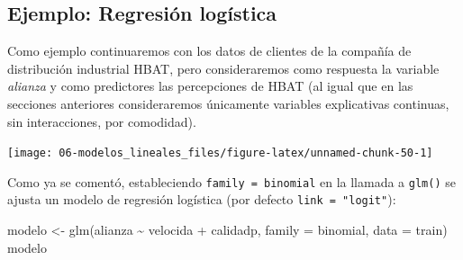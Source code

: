 \documentclass[
]{book}
\newenvironment{Shaded}{\begin{snugshade}}{\end{snugshade}}
\newcommand{\AttributeTok}[1]{\textcolor[rgb]{0.77,0.63,0.00}{#1}}
\newcommand{\CommentTok}[1]{\textcolor[rgb]{0.56,0.35,0.01}{\textit{#1}}}
\newcommand{\DecValTok}[1]{\textcolor[rgb]{0.00,0.00,0.81}{#1}}
\newcommand{\FloatTok}[1]{\textcolor[rgb]{0.00,0.00,0.81}{#1}}
\newcommand{\FunctionTok}[1]{\textcolor[rgb]{0.00,0.00,0.00}{#1}}
\newcommand{\NormalTok}[1]{#1}
\newcommand{\OtherTok}[1]{\textcolor[rgb]{0.56,0.35,0.01}{#1}}
\newcommand{\SpecialCharTok}[1]{\textcolor[rgb]{0.00,0.00,0.00}{#1}}
\theoremstyle{break}
\theoremstyle{definition}
\theoremstyle{definition}
\theoremstyle{definition}
\theoremstyle{definition}
\theoremstyle{remark}
\begin{document}
\hypertarget{ejemplo-regresiuxf3n-loguxedstica}{%
\subsection{Ejemplo: Regresión logística}\label{ejemplo-regresiuxf3n-loguxedstica}}

Como ejemplo continuaremos con los datos de clientes de la compañía de distribución industrial HBAT, pero consideraremos como respuesta la variable \emph{alianza} y como predictores las percepciones de HBAT (al igual que en las secciones anteriores consideraremos únicamente variables explicativas continuas, sin interacciones, por comodidad).

\begin{Shaded}
\end{Shaded}

\begin{center}\texttt{[image: 06-modelos\_lineales\_files/figure-latex/unnamed-chunk-50-1]} \end{center}

Como ya se comentó, estableciendo \texttt{family\ =\ binomial} en la llamada a \texttt{glm()} se ajusta un modelo de regresión logística (por defecto \texttt{link\ =\ "logit"}):

\begin{Shaded}
\begin{Highlighting}[]
\NormalTok{modelo }\OtherTok{\textless{}{-}} \FunctionTok{glm}\NormalTok{(alianza }\SpecialCharTok{\textasciitilde{}}\NormalTok{ velocida }\SpecialCharTok{+}\NormalTok{ calidadp, }\AttributeTok{family =}\NormalTok{ binomial, }\AttributeTok{data =}\NormalTok{ train)}
\NormalTok{modelo}
\end{Highlighting}
\end{Shaded}
\end{document}
